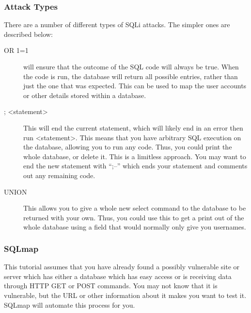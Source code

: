 		\subsubsection{Attack Types}
			There are a number of different types of SQLi attacks. 
			The simpler ones are described below:
			\begin{description}
				\item[OR 1=1] will ensure that the outcome of the SQL code will always be true. 
					When the code is run, the database will return all possible entries, rather than just the one that was expected. 
					This can be used to map the user accounts or other details stored within a database. 
				\item[; <statement>] This will end the current statement, which will likely end in an error then run <statement>.
					This means that you have arbitrary SQL execution on the database, allowing you to run any code. 
					Thus, you could print the whole database, or delete it. 
					This is a limitless approach. 
					You may want to end the new statement with ``;--'' which ends your statement and comments out any remaining code. 
				\item[UNION] This allows you to give a whole new select command to the database to be returned with your own. 
					Thus, you could use this to get a print out of the whole database using a field that would normally only give you usernames. 

			\end{description}
		\subsubsection{SQLmap}
			This tutorial assumes that you have already found a possibly vulnerable site or server which has either a database which has easy access or is receiving data through HTTP GET or POST commands. 
			You may not know that it is vulnerable, but the URL or other information about it makes you want to test it. 
			SQLmap will automate this process for you. 

